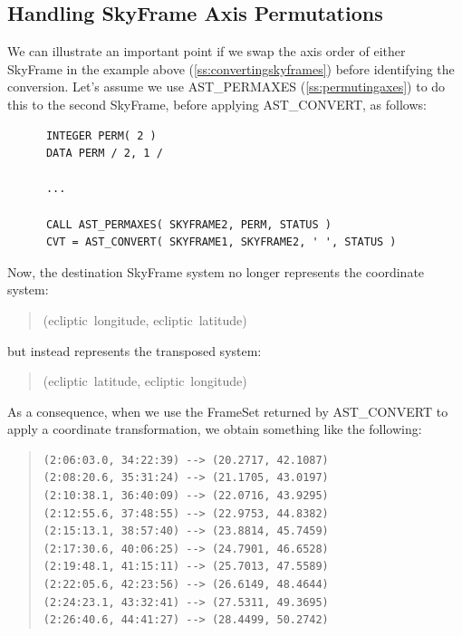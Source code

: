 \documentclass[twoside,11pt]{article}
\newcommand{\htmlref}[2]{#1}
\newcommand{\secref}[1]{\S\ref{#1}}
\renewcommand{\secref}[1]{\ref{#1}}
\begin{document}
\subsection{\label{ss:convertingpermutedaxes}Handling SkyFrame Axis Permutations}

We can illustrate an important point if we swap the axis order of
either \htmlref{SkyFrame}{SkyFrame} in the example above (\secref{ss:convertingskyframes})
before identifying the conversion. Let's assume we use \htmlref{AST\_PERMAXES}{AST_PERMAXES}
(\secref{ss:permutingaxes}) to do this to the second SkyFrame, before
applying \htmlref{AST\_CONVERT}{AST_CONVERT}, as follows:

\small
\begin{verbatim}
      INTEGER PERM( 2 )
      DATA PERM / 2, 1 /

      ...

      CALL AST_PERMAXES( SKYFRAME2, PERM, STATUS )
      CVT = AST_CONVERT( SKYFRAME1, SKYFRAME2, ' ', STATUS )
\end{verbatim}
\normalsize

Now, the destination SkyFrame system no longer represents the
coordinate system:

\begin{quote}
(ecliptic~longitude, ecliptic~latitude)
\end{quote}

but instead represents the transposed system:

\begin{quote}
(ecliptic~latitude, ecliptic~longitude)
\end{quote}

As a consequence, when we use the \htmlref{FrameSet}{FrameSet} returned by AST\_CONVERT to
apply a coordinate transformation, we obtain something like the
following:

\begin{quote}
\begin{verbatim}
(2:06:03.0, 34:22:39) --> (20.2717, 42.1087)
(2:08:20.6, 35:31:24) --> (21.1705, 43.0197)
(2:10:38.1, 36:40:09) --> (22.0716, 43.9295)
(2:12:55.6, 37:48:55) --> (22.9753, 44.8382)
(2:15:13.1, 38:57:40) --> (23.8814, 45.7459)
(2:17:30.6, 40:06:25) --> (24.7901, 46.6528)
(2:19:48.1, 41:15:11) --> (25.7013, 47.5589)
(2:22:05.6, 42:23:56) --> (26.6149, 48.4644)
(2:24:23.1, 43:32:41) --> (27.5311, 49.3695)
(2:26:40.6, 44:41:27) --> (28.4499, 50.2742)
\end{verbatim}
\end{quote}
\end{document}
